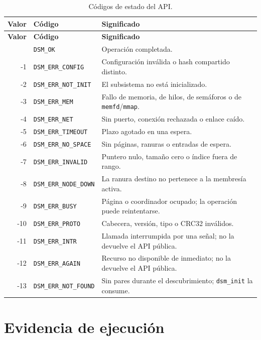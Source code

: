 {\footnotesize
\begin{xltabular}{\linewidth}{@{}r l Y@{}}
\caption{Códigos de estado del API.}\label{tab:codigos-estado}\\
\toprule
\textbf{Valor} & \textbf{Código} & \textbf{Significado} \\
\midrule
\endfirsthead
\toprule
\textbf{Valor} & \textbf{Código} & \textbf{Significado} \\
\midrule
\endhead
\bottomrule
{} & \texttt{DSM\_OK} & Operación completada. \\
-1 & \texttt{DSM\_ERR\_CONFIG} & Configuración inválida o hash compartido distinto. \\
-2 & \texttt{DSM\_ERR\_NOT\_INIT} & El subsistema no está inicializado. \\
-3 & \texttt{DSM\_ERR\_MEM} & Fallo de memoria, de hilos, de semáforos o de \texttt{memfd}/\texttt{mmap}. \\
-4 & \texttt{DSM\_ERR\_NET} & Sin puerto, conexión rechazada o enlace caído. \\
-5 & \texttt{DSM\_ERR\_TIMEOUT} & Plazo agotado en una espera. \\
-6 & \texttt{DSM\_ERR\_NO\_SPACE} & Sin páginas, ranuras o entradas de espera. \\
-7 & \texttt{DSM\_ERR\_INVALID} & Puntero nulo, tamaño cero o índice fuera de rango. \\
-8 & \texttt{DSM\_ERR\_NODE\_DOWN} & La ranura destino no pertenece a la membresía activa. \\
-9 & \texttt{DSM\_ERR\_BUSY} & Página o coordinador ocupado; la operación puede reintentarse. \\
-10 & \texttt{DSM\_ERR\_PROTO} & Cabecera, versión, tipo o CRC32 inválidos. \\
-11 & \texttt{DSM\_ERR\_INTR} & Llamada interrumpida por una señal; no la devuelve el API pública. \\
-12 & \texttt{DSM\_ERR\_AGAIN} & Recurso no disponible de inmediato; no la devuelve el API pública. \\
-13 & \texttt{DSM\_ERR\_NOT\_FOUND} & Sin pares durante el descubrimiento; \texttt{dsm\_init} la consume. \\
\end{xltabular}
}

\section{Evidencia de ejecución}\label{app:evidencia}

